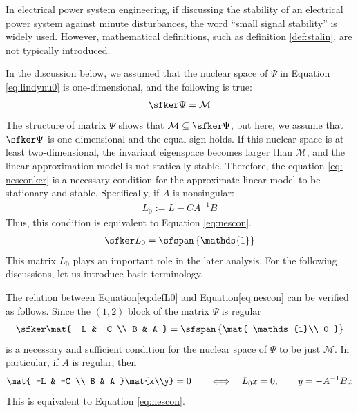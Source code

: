 \documentclass[tombow,dvipdfmx]{corona-a5-1.1}
\begin{document}
In electrical power system engineering, if discussing the stability of an electrical power system against minute disturbances, the word “small signal stability” is widely used.
However, mathematical definitions, such as definition \ref{def:stalin}, are not typically introduced.

In the discussion below, we assumed that the nuclear space of $\Psi$ in Equation \ref{eq:lindynu0} is one-dimensional, and the following is true:
\begin{align}\label{eq:nesconker}
\sfker \Psi = \mathcal{M}
\end{align}
The structure of matrix $\Psi$ shows that $\mathcal{M} \subseteq \sfker \Psi $, but here, we assume that $\sfker \Psi$ is one-dimensional and the equal sign holds.
If this nuclear space is at least two-dimensional, the invariant eigenspace becomes larger than $\mathcal{M}$, and the linear approximation model is not statically stable.
Therefore, the equation \ref{eq: nesconker} is a necessary condition for the approximate linear model to be stationary and stable.
Specifically, if $A$ is nonsingular:
\begin{align}\label{eq:defL0}
L_0:= L-CA^{-1}B 
\end{align}
Thus, this condition is equivalent to Equation \ref{eq:nescon}. 
\begin{align}\label{eq:nescon}
\sfker L_0 = \sfspan
\left\{
\mathds{1}
\right\}
\end{align}
This matrix $L_0$ plays an important role in the later analysis.
For the following discussions, let us introduce basic terminology.

The relation between Equation\ref{eq:defL0} and Equation\ref{eq:nescon} can be verified as follows.
Since the $(1,2)$ block of the matrix $\Psi$ is regular
\begin{align*}%
\sfker \mat{
-L & -C \\
B & A
}
= \sfspan
\left\{
\mat{
\mathds{1}\\
0
}
\right\}
\end{align*}
is a necessary and sufficient condition for the nuclear space of $\Psi$ to be just $\mathcal{M}$.
In particular, if $A$ is regular, then
\begin{align*}
\mat{
-L & -C \\
B & A
}\mat{x\\y}
=0
\qquad
\Longleftrightarrow
\quad
L_0 x=0,
\qquad
y=-A^{-1}Bx
\end{align*}
This is equivalent to Equation \ref{eq:nescon}.
\end{document}
